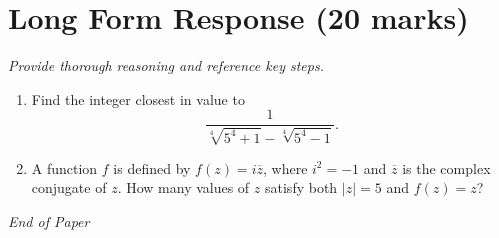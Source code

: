 \documentclass[12pt]{article}
\begin{document}
\section*{Long Form Response (20 marks)}
\textit{Provide thorough reasoning and reference key steps.}
\begin{enumerate}[label=\arabic*.]
\item Find the integer closest in value to \[\frac{1}{\sqrt[4]{5^4+1}-\sqrt[4]{5^4-1}}.\]
\item A function $f$ is defined by $f(z) = i\overline{z}$, where $i^2 = -1$ and $\overline{z}$
is the complex conjugate of $z$. How many values of $z$ satisfy both $|z| = 5$ and $f(z) =
z$?
\end{enumerate}

\vfill
\noindent\textit{End of Paper}
\end{document}
